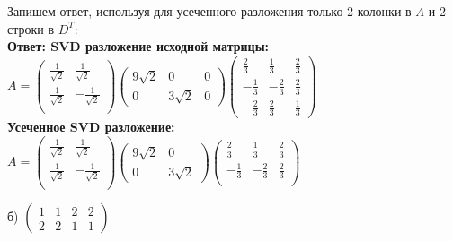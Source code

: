 \documentclass[a4paper,12pt]{article}
\begin{document}
\begin{enumerate}
Запишем ответ, используя для усеченного разложения только 2 колонки в $\Lambda$ и 2 строки в $D^T$:\\
\textbf{Ответ: SVD разложение исходной матрицы:\\ $A = \begin{pmatrix}
\frac{1}{\sqrt{2}}&\frac{1}{\sqrt{2}}\\
\frac{1}{\sqrt{2}}&-\frac{1}{\sqrt{2}}\\
\end{pmatrix} \begin{pmatrix}
9\sqrt{2}&0&0\\
0&3\sqrt{2}&0
\end{pmatrix} \begin{pmatrix}
\frac{2}{3}&\frac{1}{3}&\frac{2}{3}\\
-\frac{1}{3}&-\frac{2}{3}&\frac{2}{3}\\
-\frac{2}{3}&\frac{2}{3}&\frac{1}{3}
\end{pmatrix}$ \\
Усеченное SVD разложение:
$A = \begin{pmatrix}
\frac{1}{\sqrt{2}}&\frac{1}{\sqrt{2}}\\
\frac{1}{\sqrt{2}}&-\frac{1}{\sqrt{2}}\\
\end{pmatrix} \begin{pmatrix}
9\sqrt{2}&0\\
0&3\sqrt{2}
\end{pmatrix} \begin{pmatrix}
\frac{2}{3}&\frac{1}{3}&\frac{2}{3}\\
-\frac{1}{3}&-\frac{2}{3}&\frac{2}{3}\\
\end{pmatrix}$ }


б)
$
\begin{pmatrix}
{1}&{1}&{2}&{2}\\
{2}&{2}&{1}&{1}
\end{pmatrix}
$


\end{enumerate}
\end{document}

